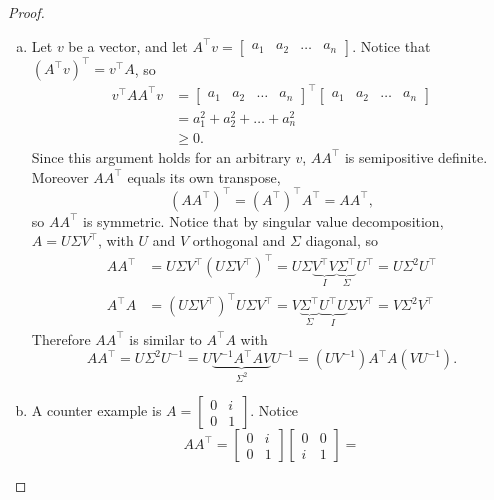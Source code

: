 \documentclass{article}
\begin{document}
\begin{proof} ~
  \begin{enumerate}[(a)]
  \item
  Let $v$ be a vector, and let $
    A^\top v = \begin{bmatrix} a_1 & a_2 & \dots & a_n \end{bmatrix}.
  $ Notice that $(A^\top v)^\top = v^\top A$, so \begin{align*}
    v^\top AA^\top v
    &= \begin{bmatrix}
      a_1 & a_2 & \dots & a_n
    \end{bmatrix}^\top
    \begin{bmatrix}
      a_1 & a_2 & \dots & a_n
    \end{bmatrix} \\
    &= a_1^2 + a_2^2 + \dots + a_n^2 \\
    &\geq 0.
  \end{align*} Since this argument holds for an arbitrary $v$, $AA^\top$ is
  semipositive definite. Moreover $AA^\top$ equals its own transpose, \[
    (AA^\top)^\top = (A^\top)^\top A^\top = AA^\top,
  \] so $AA^\top$ is symmetric.
  Notice that by singular value decomposition, $A = U\Sigma V^\top$, with $U$
  and $V$ orthogonal and $\Sigma$ diagonal, so \begin{align*}
    AA^\top
      &= U\Sigma V^\top(U\Sigma V^\top)^\top
      = U\Sigma \underbrace{V^\top V}_I\underbrace{\Sigma^\top}_\Sigma U^\top
      = U\Sigma^2 U^\top \\
    A^\top A
      &= (U\Sigma V^\top)^\top U\Sigma V^\top
      = V \underbrace{\Sigma^\top}_\Sigma \underbrace{U^\top U}_I\Sigma V^\top
      = V\Sigma^2V^\top
  \end{align*}
  Therefore $AA^\top$ is similar to $A^\top A$ with \[
    AA^\top
      = U\Sigma^2U^{-1}
      = U\underbrace{V^{-1}A^\top AV}_{\Sigma^2}U^{-1}
      = (UV^{-1})A^\top A (VU^{-1}).
  \]
  \item A counter example is $
    A = \begin{bmatrix} 0 & i \\ 0 & 1\end{bmatrix}
  $. Notice \[
    AA^\top =
    \begin{bmatrix} 0 & i \\ 0 & 1\end{bmatrix}
    \begin{bmatrix} 0 & 0 \\ i & 1\end{bmatrix} =
\]
\end{enumerate}
\end{proof}
\end{document}
